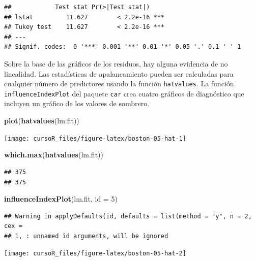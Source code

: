 \documentclass[]{book}
\newenvironment{Shaded}{\begin{snugshade}}{\end{snugshade}}
\newcommand{\KeywordTok}[1]{\textcolor[rgb]{0.13,0.29,0.53}{\textbf{#1}}}
\newcommand{\DataTypeTok}[1]{\textcolor[rgb]{0.13,0.29,0.53}{#1}}
\newcommand{\DecValTok}[1]{\textcolor[rgb]{0.00,0.00,0.81}{#1}}
\newcommand{\NormalTok}[1]{#1}
\begin{document}
\begin{verbatim}
##            Test stat Pr(>|Test stat|)    
## lstat         11.627        < 2.2e-16 ***
## Tukey test    11.627        < 2.2e-16 ***
## ---
## Signif. codes:  0 '***' 0.001 '**' 0.01 '*' 0.05 '.' 0.1 ' ' 1
\end{verbatim}

Sobre la base de las gráficos de los residuos, hay alguna evidencia de
no linealidad. Las estadísticas de apalancamiento pueden ser calculadas
para cualquier número de predictores usando la función
\texttt{hatvalues}. La función \texttt{influenceIndexPlot} del paquete
\texttt{car} crea cuatro gráficos de diagnóstico que incluyen un gráfico
de los valores de sombrero.

\begin{Shaded}
\begin{Highlighting}[]
\KeywordTok{plot}\NormalTok{(}\KeywordTok{hatvalues}\NormalTok{(lm.fit))}
\end{Highlighting}
\end{Shaded}

\begin{center}\texttt{[image: cursoR\_files/figure-latex/boston-05-hat-1]} \end{center}

\begin{Shaded}
\begin{Highlighting}[]
\KeywordTok{which.max}\NormalTok{(}\KeywordTok{hatvalues}\NormalTok{(lm.fit))}
\end{Highlighting}
\end{Shaded}

\begin{verbatim}
## 375 
## 375
\end{verbatim}

\begin{Shaded}
\begin{Highlighting}[]
\KeywordTok{influenceIndexPlot}\NormalTok{(lm.fit, }\DataTypeTok{id =} \DecValTok{5}\NormalTok{)}
\end{Highlighting}
\end{Shaded}

\begin{verbatim}
## Warning in applyDefaults(id, defaults = list(method = "y", n = 2, cex =
## 1, : unnamed id arguments, will be ignored
\end{verbatim}

\begin{center}\texttt{[image: cursoR\_files/figure-latex/boston-05-hat-2]} \end{center}
\end{document}

